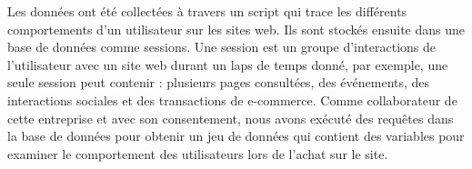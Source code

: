 Les données ont été collectées à travers un script qui trace les différents comportements d'un  utilisateur sur les sites web. Ils sont stockés ensuite dans une base de données comme sessions. Une  session est un groupe d'interactions de l'utilisateur avec un site web durant un laps de temps donné,  par exemple, une seule session peut contenir : plusieurs pages consultées, des événements, des  interactions sociales et des transactions de e-commerce. Comme collaborateur de cette entreprise  et avec son consentement, nous avons exécuté des requêtes dans la base de données pour obtenir  un jeu de données qui contient des variables pour examiner le comportement des utilisateurs lors de  l’achat sur le site.




